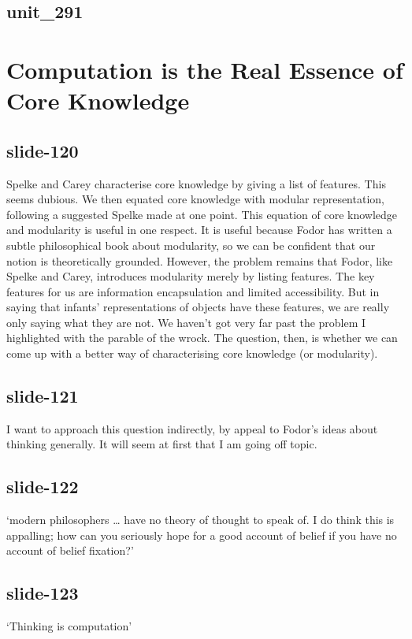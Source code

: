 \documentclass[12pt,\papersize]{extarticle}
\begin{document}
 
\subsection{unit\_291}
 
\section{Computation is the Real Essence of Core Knowledge}
 
 
\subsection{slide-120}
Spelke and Carey characterise core knowledge by giving a list of features.
This seems dubious.
We then equated core knowledge with modular representation, following a suggested Spelke made at one point.
This equation of core knowledge and modularity is useful in one respect.
It is useful because Fodor has written a subtle philosophical book about modularity, so we can be confident that our notion is theoretically grounded.
However, the problem remains that Fodor, like Spelke and Carey, introduces modularity merely by listing features.
The key features for us are information encapsulation and limited accessibility.
But in saying that infants' representations of objects have these features, we are really only saying what they are not.
We haven't got very far past the problem I highlighted with the parable of the wrock.
The question, then, is whether we can come up with a better way of characterising core knowledge (or modularity).
 
 
\subsection{slide-121}
I want to approach this question indirectly, by appeal to Fodor's ideas about thinking generally.
It will seem at first that I am going off topic.
 
 
\subsection{slide-122}
‘modern philosophers … have no theory of thought to speak of. I do think this is appalling; how can you seriously hope for a good account of belief if you have no account of belief fixation?’
\citep[p.\ 147]{Fodor:1987rt}
 
 
\subsection{slide-123}
‘Thinking is computation’
\citep[p.\ 9]{Fodor:1998ap}
 
\end{document}
